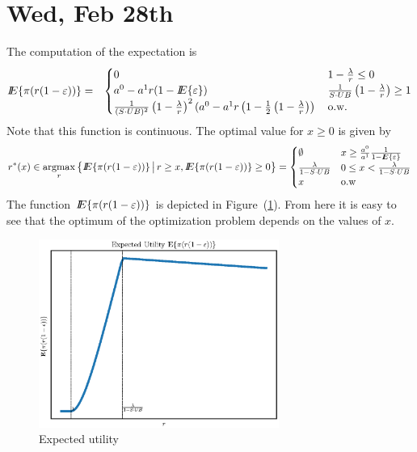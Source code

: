 \section{Wed, Feb 28th}
The computation of the expectation is
\begin{eqnarray*}
{I\kern-.35em E}\{ \pi(r(1-\varepsilon))\}&=&\begin{cases}
0&1-\frac{\lambda}{r}\leq 0\\
a^0-a^1r(1-{I\kern-.35em E}\{\varepsilon\})&\frac{1}{S\cdot UB}\left(1-\frac{\lambda}{r}\right)\geq 1\\
\frac{1}{(S\cdot UB)^2}\left(1-\frac{\lambda}{r}\right)^2(a^0-a^1r\left(1-\frac{1}{2}\left(1-\frac{\lambda}{r}\right)\right)\,&{\rm o.w.}
\end{cases}
\end{eqnarray*}
Note that this function is continuous.  The optimal value for $x\geq 0$ is given by
\begin{equation}
r^*(x)\in\mathop{\rm argmax}_r \big\lbrace {I\kern-.35em E}\{ \pi(r(1-\varepsilon))\}{\,\big\vert\,} r\geq x, {I\kern-.35em E}\{ \pi(r(1-\varepsilon))\}\geq 0\big\rbrace = \begin{cases}
\emptyset & x\geq \frac{a^0}{a^1}\frac{1}{1-{I\kern-.35em E}\{\varepsilon\}}\\
\frac{\lambda}{1-S\cdot UB}& 0\leq x<\frac{\lambda}{1-S\cdot UB}\\
x& \mbox{o.w}\end{cases}
\end{equation}
The function ${I\kern-.35em E}\{ \pi(r(1-\varepsilon))\}$ is depicted in Figure~(\ref{figExUt}).  From here it is easy to see that the optimum of the optimization problem depends on the values of $x$.

\begin{figure}[htbp] %
   \centering
   \includegraphics[width=0.7\textwidth]{ExpectedUt} 
   \caption{Expected utility}
   \label{figExUt}
\end{figure}

